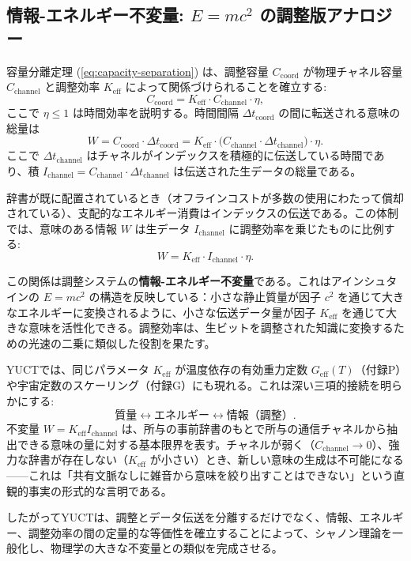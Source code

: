 \documentclass[12pt,a4paper]{article}
\theoremstyle{definition}
\theoremstyle{remark}
\begin{document}
	\subsection{情報-エネルギー不変量: $E=mc^2$ の調整版アナロジー}
	\label{subsec:info_energy_invariant}
	
	容量分離定理 (\ref{eq:capacity-separation}) は、調整容量 $C_{\text{coord}}$ が物理チャネル容量 $C_{\text{channel}}$ と調整効率 $K_{\mathrm{eff}}$ によって関係づけられることを確立する:
	\[
	C_{\text{coord}} = K_{\mathrm{eff}} \cdot C_{\text{channel}} \cdot \eta,
	\]
	ここで $\eta \le 1$ は時間効率を説明する。時間間隔 $\Delta t_{\text{coord}}$ の間に転送される意味の総量は
	\[
	W = C_{\text{coord}} \cdot \Delta t_{\text{coord}} = K_{\mathrm{eff}} \cdot \bigl( C_{\text{channel}} \cdot \Delta t_{\text{channel}} \bigr) \cdot \eta.
	\]
	ここで $\Delta t_{\text{channel}}$ はチャネルがインデックスを積極的に伝送している時間であり、積 $I_{\text{channel}} = C_{\text{channel}} \cdot \Delta t_{\text{channel}}$ は伝送された生データの総量である。
	
	辞書が既に配置されているとき（オフラインコストが多数の使用にわたって償却されている）、支配的なエネルギー消費はインデックスの伝送である。この体制では、意味のある情報 $W$ は生データ $I_{\text{channel}}$ に調整効率を乗じたものに比例する:
	\[
	\boxed{W = K_{\mathrm{eff}} \cdot I_{\text{channel}} \cdot \eta}.
	\]
	
	この関係は調整システムの\textbf{情報-エネルギー不変量}である。これはアインシュタインの $E = m c^2$ の構造を反映している：小さな静止質量が因子 $c^2$ を通じて大きなエネルギーに変換されるように、小さな伝送データ量が因子 $K_{\mathrm{eff}}$ を通じて大きな意味を活性化できる。調整効率は、生ビットを調整された知識に変換するための光速の二乗に類似した役割を果たす。
	
	YUCTでは、同じパラメータ $K_{\mathrm{eff}}$ が温度依存の有効重力定数 $G_{\text{eff}}(T)$（付録P）や宇宙定数のスケーリング（付録G）にも現れる。これは深い三項的接続を明らかにする:
	\[
	\text{質量} \leftrightarrow \text{エネルギー} \leftrightarrow \text{情報（調整）}.
	\]
	不変量 $W = K_{\mathrm{eff}} I_{\text{channel}}$ は、所与の事前辞書のもとで所与の通信チャネルから抽出できる意味の量に対する基本限界を表す。チャネルが弱く（$C_{\text{channel}} \to 0$）、強力な辞書が存在しない（$K_{\mathrm{eff}}$ が小さい）とき、新しい意味の生成は不可能になる——これは「共有文脈なしに雑音から意味を絞り出すことはできない」という直観的事実の形式的な言明である。
	
	したがってYUCTは、調整とデータ伝送を分離するだけでなく、情報、エネルギー、調整効率の間の定量的な等価性を確立することによって、シャノン理論を一般化し、物理学の大きな不変量との類似を完成させる。
	
\end{document}
